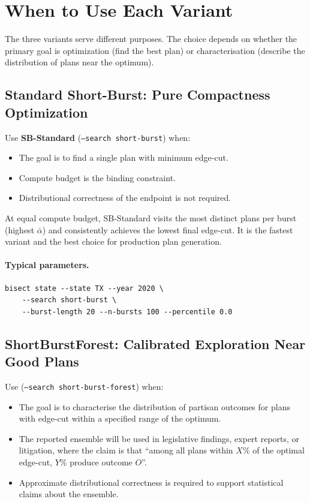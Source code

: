 \section{When to Use Each Variant}
\label{sec:when-to-use}

The three \sburst{} variants serve different purposes.
The choice depends on whether the primary goal is optimization (find the
best plan) or characterisation (describe the distribution of plans near
the optimum).

\subsection{Standard Short-Burst: Pure Compactness Optimization}

Use \textbf{SB-Standard} (\texttt{--search short-burst}) when:
\begin{itemize}
  \item The goal is to find a single plan with minimum edge-cut.
  \item Compute budget is the binding constraint.
  \item Distributional correctness of the endpoint is not required.
\end{itemize}

At equal compute budget, SB-Standard visits the most distinct plans per
burst (highest $\bar\alpha$) and consistently achieves the lowest final
edge-cut.
It is the fastest variant and the best choice for production plan generation.

\paragraph{Typical parameters.}
\begin{verbatim}
bisect state --state TX --year 2020 \
    --search short-burst \
    --burst-length 20 --n-bursts 100 --percentile 0.0
\end{verbatim}

\subsection{ShortBurstForest: Calibrated Exploration Near Good Plans}

Use \textbf{\sbf{}} (\texttt{--search short-burst-forest}) when:
\begin{itemize}
  \item The goal is to characterise the distribution of partisan outcomes
        for plans with edge-cut within a specified range of the optimum.
  \item The reported ensemble will be used in legislative findings, expert
        reports, or litigation, where the claim is that ``among all plans
        within $X$\% of the optimal edge-cut, $Y$\% produce outcome $O$''.
  \item Approximate distributional correctness is required to support
        statistical claims about the ensemble.
\end{itemize}

